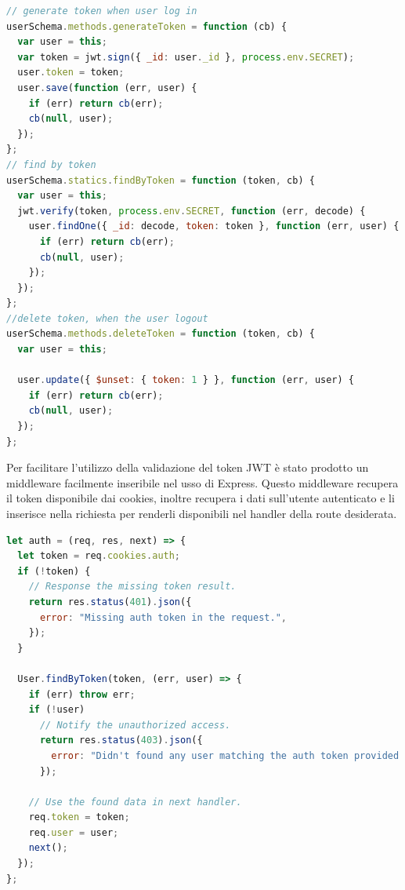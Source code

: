 \begin{lstlisting}[language=Javascript]
// generate token when user log in
userSchema.methods.generateToken = function (cb) {
  var user = this;
  var token = jwt.sign({ _id: user._id }, process.env.SECRET);
  user.token = token;
  user.save(function (err, user) {
    if (err) return cb(err);
    cb(null, user);
  });
};
// find by token
userSchema.statics.findByToken = function (token, cb) {
  var user = this;
  jwt.verify(token, process.env.SECRET, function (err, decode) {
    user.findOne({ _id: decode, token: token }, function (err, user) {
      if (err) return cb(err);
      cb(null, user);
    });
  });
};
//delete token, when the user logout
userSchema.methods.deleteToken = function (token, cb) {
  var user = this;

  user.update({ $unset: { token: 1 } }, function (err, user) {
    if (err) return cb(err);
    cb(null, user);
  });
};

\end{lstlisting}

Per facilitare l'utilizzo della validazione del token JWT è stato prodotto un middleware facilmente inseribile nel 
usso di Express. Questo middleware recupera il token disponibile dai cookies, inoltre recupera i dati sull'utente
autenticato e li inserisce nella richiesta per renderli disponibili nel handler della
route desiderata.
\begin{lstlisting}[language=Javascript]
let auth = (req, res, next) => {
  let token = req.cookies.auth;
  if (!token) {
    // Response the missing token result.
    return res.status(401).json({
      error: "Missing auth token in the request.",
    });
  }

  User.findByToken(token, (err, user) => {
    if (err) throw err;
    if (!user)
      // Notify the unauthorized access.
      return res.status(403).json({
        error: "Didn't found any user matching the auth token provided.",
      });

    // Use the found data in next handler.
    req.token = token;
    req.user = user;
    next();
  });
};

\end{lstlisting}
